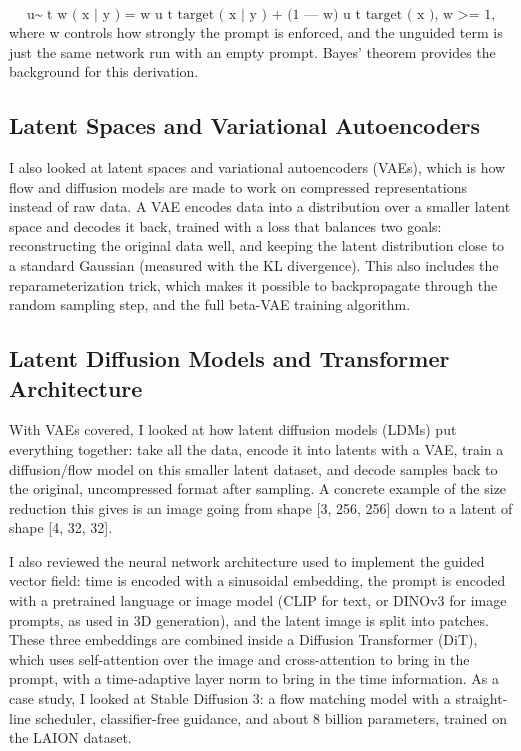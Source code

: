 \documentclass[11pt,a4paper]{article}
\begin{document}
\[ \text{u\textasciitilde{} t w ( x | y )  =  w u t target ( x | y ) + (1 --- w) u t target ( x ),    w >= 1,} \]
where w controls how strongly the prompt is enforced, and the unguided term is just the same network run with an empty prompt. Bayes' theorem provides the background for this derivation.

\subsection{Latent Spaces and Variational Autoencoders}
I also looked at latent spaces and variational autoencoders (VAEs), which is how flow and diffusion models are made to work on compressed representations instead of raw data. A VAE encodes data into a distribution over a smaller latent space and decodes it back, trained with a loss that balances two goals: reconstructing the original data well, and keeping the latent distribution close to a standard Gaussian (measured with the KL divergence). This also includes the reparameterization trick, which makes it possible to backpropagate through the random sampling step, and the full beta-VAE training algorithm.

\subsection{Latent Diffusion Models and Transformer Architecture}
With VAEs covered, I looked at how latent diffusion models (LDMs) put everything together: take all the data, encode it into latents with a VAE, train a diffusion/flow model on this smaller latent dataset, and decode samples back to the original, uncompressed format after sampling. A concrete example of the size reduction this gives is an image going from shape [3, 256, 256] down to a latent of shape [4, 32, 32].

I also reviewed the neural network architecture used to implement the guided vector field: time is encoded with a sinusoidal embedding, the prompt is encoded with a pretrained language or image model (CLIP for text, or DINOv3 for image prompts, as used in 3D generation), and the latent image is split into patches. These three embeddings are combined inside a Diffusion Transformer (DiT), which uses self-attention over the image and cross-attention to bring in the prompt, with a time-adaptive layer norm to bring in the time information. As a case study, I looked at Stable Diffusion 3: a flow matching model with a straight-line scheduler, classifier-free guidance, and about 8 billion parameters, trained on the LAION dataset.
\end{document}
